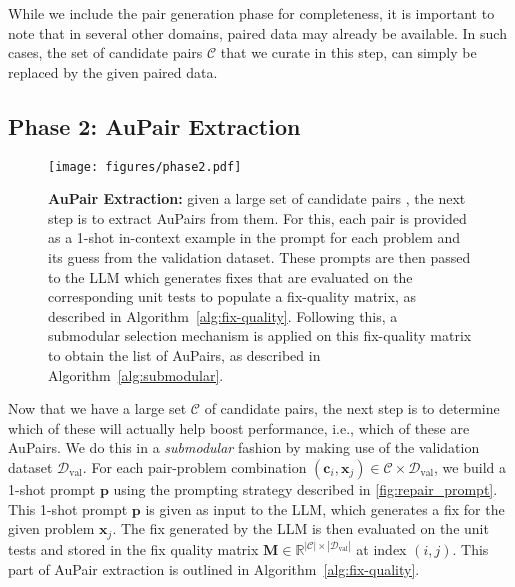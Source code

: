\documentclass[11pt, a4paper, logo, copyright]{googledeepmind}
\def\aupair/{\textcolor{golden}{Au}Pair}
\def\aupairs/{\textcolor{golden}{Au}Pairs}
\newcommand*{\inimg}[1]{
    \raisebox{-.2\baselineskip}{
        \texttt{[image: \#1]}
    }
}
\newcommand*{\inbigimg}[1]{
    \raisebox{-.2\baselineskip}{
        \texttt{[image: \#1]}
    }
}
\begin{document}
While we include the pair generation phase for completeness, it is important to note that in several other domains, paired data may already be available. In such cases, the set of candidate pairs $\mathcal{C}$ that we curate in this step, can simply be replaced by the given paired data.


\subsection{Phase 2: \aupair/ Extraction}
\label{sec:phase2}

\begin{figure}[t]
    \centering
    \texttt{[image: figures/phase2.pdf]}
    \caption{\textbf{\aupair/ Extraction:} given a large set of candidate pairs \inbigimg{figures/pair.png}, the next step is to extract \aupairs/ from them. For this, each pair \inbigimg{figures/pair.png} is provided as a 1-shot in-context example in the prompt for each problem and its guess \inimg{figures/val.png} from the validation dataset. These prompts are then passed to the LLM which generates fixes that are evaluated on the corresponding unit tests to populate a fix-quality matrix, as described in Algorithm~\ref{alg:fix-quality}. Following this, a submodular selection mechanism is applied on this fix-quality matrix to obtain the list of \aupairs/, as described in Algorithm~\ref{alg:submodular}.}
    \label{fig:phase2}
\end{figure}


Now that we have a large set $\mathcal{C}$ of candidate pairs, the next step is to determine which of these will actually help boost performance, i.e., which of these are \aupairs/. We do this in a \emph{submodular} fashion by making use of the validation dataset $\mathcal{D}_\text{val}$. For each pair-problem combination $(\bm{c}_i, \bm{x}_j) \in \mathcal{C} \times \mathcal{D}_\text{val}$, we build a 1-shot prompt $\bm{p}$ using the prompting strategy described in \ref{fig:repair_prompt}. This 1-shot prompt $\bm{p}$ is given as input to the LLM, which generates a fix for the given problem $\bm{x}_j$. The fix generated by the LLM is then evaluated on the unit tests and stored in the fix quality matrix $\bm{M} \in \mathbb{R}^{|\mathcal{C}|\times|\mathcal{D}_\text{val}|}$ at index $(i, j)$. This part of \aupair/ extraction is outlined in Algorithm~\ref{alg:fix-quality}.
\end{document}
